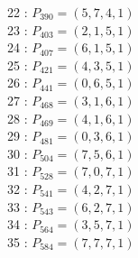 \documentclass{article}
\begin{document}
{\begin{multicols}{2}
22 : $P_{390}=( 5, 7, 4, 1 )$\\
23 : $P_{403}=( 2, 1, 5, 1 )$\\
24 : $P_{407}=( 6, 1, 5, 1 )$\\
25 : $P_{421}=( 4, 3, 5, 1 )$\\
26 : $P_{441}=( 0, 6, 5, 1 )$\\
27 : $P_{468}=( 3, 1, 6, 1 )$\\
28 : $P_{469}=( 4, 1, 6, 1 )$\\
29 : $P_{481}=( 0, 3, 6, 1 )$\\
30 : $P_{504}=( 7, 5, 6, 1 )$\\
31 : $P_{528}=( 7, 0, 7, 1 )$\\
32 : $P_{541}=( 4, 2, 7, 1 )$\\
33 : $P_{543}=( 6, 2, 7, 1 )$\\
34 : $P_{564}=( 3, 5, 7, 1 )$\\
35 : $P_{584}=( 7, 7, 7, 1 )$\\
\end{multicols}
}
\end{document}
